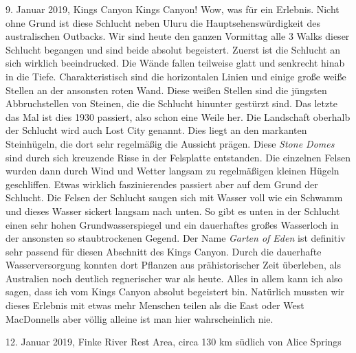 \documentclass[11pt]{book}
\begin{document}
9. Januar 2019, Kings Canyon
Kings Canyon! Wow, was für ein Erlebnis. Nicht ohne Grund ist diese Schlucht neben Uluru die Hauptsehenswürdigkeit des australischen 
Outbacks. Wir sind heute den ganzen Vormittag alle 3 Walks dieser Schlucht begangen und sind beide absolut begeistert. Zuerst ist die 
Schlucht an sich wirklich beeindrucked. Die Wände fallen teilweise glatt und senkrecht hinab in die Tiefe. Charakteristisch sind die 
horizontalen Linien und einige große weiße Stellen an der ansonsten roten Wand. Diese weißen Stellen sind die jüngsten Abbruchstellen 
von Steinen, die die Schlucht hinunter gestürzt sind. Das letzte das Mal ist dies 1930 passiert, also schon eine Weile her. Die Landschaft 
oberhalb der Schlucht wird auch Lost City genannt. Dies liegt an den markanten Steinhügeln, die dort sehr regelmäßig die Aussicht prägen.
Diese \emph{Stone Domes} sind durch sich kreuzende Risse in der Felsplatte entstanden. Die einzelnen Felsen wurden dann durch Wind und Wetter 
langsam zu regelmäßigen kleinen Hügeln geschliffen. Etwas wirklich faszinierendes passiert aber auf dem Grund der Schlucht. Die 
Felsen der Schlucht saugen sich mit Wasser voll wie ein Schwamm und dieses Wasser sickert langsam nach unten. So gibt es unten in 
der Schlucht einen sehr hohen Grundwasserspiegel und ein dauerhaftes großes Wasserloch in der ansonsten so staubtrockenen Gegend. 
Der Name \emph{Garten of Eden} ist definitiv sehr passend für diesen Abschnitt des Kings Canyon. Durch die dauerhafte Wasserversorgung 
konnten dort Pflanzen aus prähistorischer Zeit überleben, als Australien noch deutlich regnerischer war als heute. Alles in allem 
kann ich also sagen, dass ich vom Kings Canyon absolut begeistert bin. Natürlich mussten wir dieses Erlebnis mit etwas mehr Menschen 
teilen als die East oder West MacDonnells aber völlig alleine ist man hier wahrscheinlich nie.

12. Januar 2019, Finke River Rest Area, circa 130 km südlich von Alice Springs
\end{document}
